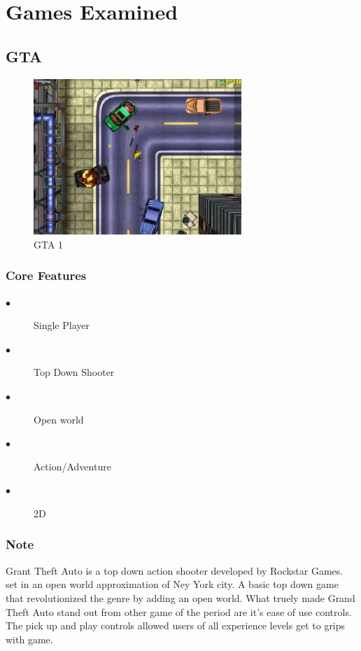 \documentclass[a4paper]{scrreprt}
\begin{document}
    \section{Games Examined}

        \subsection{GTA}

            \begin{figure}[H]
                \centering
                \includegraphics[width=0.70\textwidth]{gta1.jpg}
                \caption{\label{fig:art} GTA 1}
            \end{figure}

            \subsubsection{Core Features}
                \begin{description}
                    \item[$\bullet$] Single Player
                    \item[$\bullet$] Top Down Shooter
                    \item[$\bullet$] Open world
                    \item[$\bullet$] Action/Adventure
                    \item[$\bullet$] 2D
                \end{description}

                \subsubsection{Note}
                Grant Theft Auto is a top down action shooter developed by Rockstar Games. set in an open world approximation of Ney York city.
                A basic top down game that revolutionized the genre by adding an open world.
                What truely made Grand Theft Auto stand out from other game of the period are it's ease of use controls. 
                The pick up and play controls allowed users of all experience levels get to grips with game.
            
\end{document}
